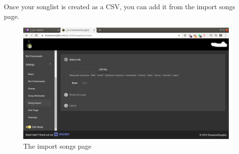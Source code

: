 Once your songlist is created as a CSV, you can add it from the import songs page.

\begin{figure}[ht!]
  \includegraphics[width=\linewidth]{src/songlist_import/import_songs.png}
  \caption{The import songs page}
  \label{import songs}
\end{figure}
